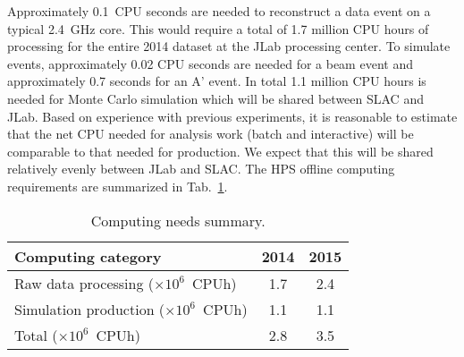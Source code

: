 Approximately 0.1~CPU seconds are needed to reconstruct a data event on 
a typical 2.4~GHz core. This would require a total of 1.7 million CPU hours of processing for the 
entire 2014 dataset at the JLab processing center.  To simulate events, approximately 0.02 CPU seconds 
are needed for a beam event and approximately 0.7 seconds for an A' event. In total 1.1 million CPU hours is needed for Monte Carlo 
simulation which will be shared between SLAC and JLab. 
Based on experience with previous experiments, it is reasonable to estimate that the net CPU needed for 
analysis work (batch and interactive) will be comparable to that needed for production. We expect 
that this will be shared relatively evenly between JLab and SLAC. The HPS offline computing requirements 
are summarized in Tab.~\ref{tab:computing}.
\begin{table}[tbp]
\centering
\begin{tabular}{|l|c|c|}
\hline
Computing category & 2014& 2015 \\
\hline
Raw data processing ($\times 10^{6}$~CPUh)  & 1.7 & 2.4 \\
Simulation production ($\times 10^{6}$~CPUh) & 1.1 & 1.1 \\
\hline
Total ($\times 10^{6}$~CPUh) & 2.8 & 3.5 \\
\hline
\end{tabular}
\caption{{\small Computing needs summary.}}
\label{tab:computing}
\end{table}
